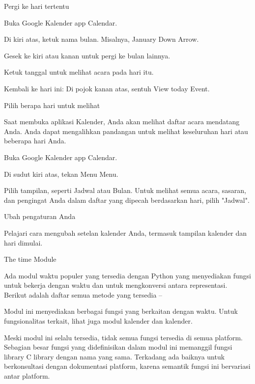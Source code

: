 \vspace{12pt}
\noindent 
Pergi ke hari tertentu \par
\noindent 
Buka Google Kalender app Calendar. \par
\noindent 
Di kiri atas, ketuk nama bulan. Misalnya, January Down Arrow. \par
\noindent 
Gesek ke kiri atau kanan untuk pergi ke bulan lainnya. \par
\noindent 
Ketuk tanggal untuk melihat acara pada hari itu. \par
\noindent 
Kembali ke hari ini: Di pojok kanan atas, sentuh View today Event. \par
\vspace{12pt}
\noindent 
Pilih berapa hari untuk melihat \par
\noindent 
Saat membuka aplikasi Kalender, Anda akan melihat daftar acara mendatang Anda. Anda dapat mengalihkan pandangan untuk melihat keseluruhan hari atau beberapa hari Anda. \par
\vspace{12pt}
\noindent 
Buka Google Kalender app Calendar. \par
\noindent 
Di sudut kiri atas, tekan Menu Menu. \par
\noindent 
Pilih tampilan, seperti Jadwal atau Bulan. Untuk melihat semua acara, sasaran, dan pengingat Anda dalam daftar yang dipecah berdasarkan hari, pilih "Jadwal". \par
\noindent 
Ubah pengaturan Anda \par
\noindent 
Pelajari cara mengubah setelan kalender Anda, termasuk tampilan kalender dan hari dimulai. \par
\vspace{12pt}
\vspace{12pt}
\noindent 
{\fontsize{16pt}{16pt}\selectfont The $  $time $  $Module \\} \par
\noindent 
 \hspace*{0.5in} Ada modul waktu populer yang tersedia dengan Python yang menyediakan fungsi untuk bekerja dengan waktu dan untuk mengkonversi antara representasi. Berikut adalah daftar semua metode yang tersedia – \par
\noindent 
Modul ini menyediakan berbagai fungsi yang berkaitan dengan waktu. Untuk fungsionalitas terkait, lihat juga modul kalender dan kalender. \par
\vspace{12pt}
\noindent 
Meski modul ini selalu tersedia, tidak semua fungsi tersedia di semua platform. Sebagian besar fungsi yang didefinisikan dalam modul ini memanggil fungsi library C library dengan nama yang sama. Terkadang ada baiknya untuk berkonsultasi dengan dokumentasi platform, karena semantik fungsi ini bervariasi antar platform. \par
